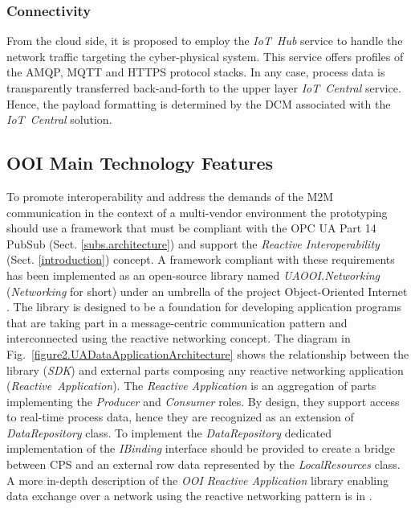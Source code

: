 \documentclass{article}
\begin{document}
\subsubsection{Connectivity}\label{connectivity}

From the cloud side, it is proposed to employ the \textit{IoT\ Hub}
service to handle the network traffic targeting the cyber-physical
system. This service offers profiles of the AMQP, MQTT and HTTPS protocol
stacks. In any case, process data is transparently
transferred back-and-forth to the upper layer \textit{IoT\ Central}
service. Hence, the payload formatting is determined by the DCM
associated with the \textit{IoT\ Central} solution.

\subsection{OOI Main Technology Features}\label{ooi-main-technology-features}

To promote interoperability and address the demands of the M2M communication in the context of a multi-vendor environment the prototyping should use a framework that must be compliant with the OPC UA Part 14 PubSub (Sect. \ref*{subs.architecture}) and support the \emph{Reactive Interoperability} (Sect. \ref*{introduction}) concept. A framework compliant with these requirements has been implemented as an open-source library named \textit{UAOOI.Networking} (\textit{Networking} for short) under an umbrella of the project Object-Oriented Internet \cite{RefWorks:doc:5c66740ae4b081adf5804596}. The library is designed to be a foundation for developing application programs that are taking part in a message-centric communication pattern and interconnected using the reactive networking concept. The diagram in Fig.~\ref*{figure2.UADataApplicationArchitecture} shows the relationship between the library (\textit{SDK}) and external parts composing any reactive networking application (\textit{Reactive\ Application}). The \textit{Reactive Application} is an aggregation of parts implementing the \textit{Producer} and \textit{Consumer} roles. By design, they support access to real-time process data, hence they are recognized as an extension of \textit{DataRepository} class. To implement the \textit{DataRepository} dedicated implementation of the \textit{IBinding} interface should be provided to create a bridge between CPS and an external row data represented by the \textit{LocalResources} class. A more in-depth description of the \textit{OOI Reactive Application} library enabling data exchange over a network using the reactive networking pattern is in \cite{mpostol2020}.
\end{document}
